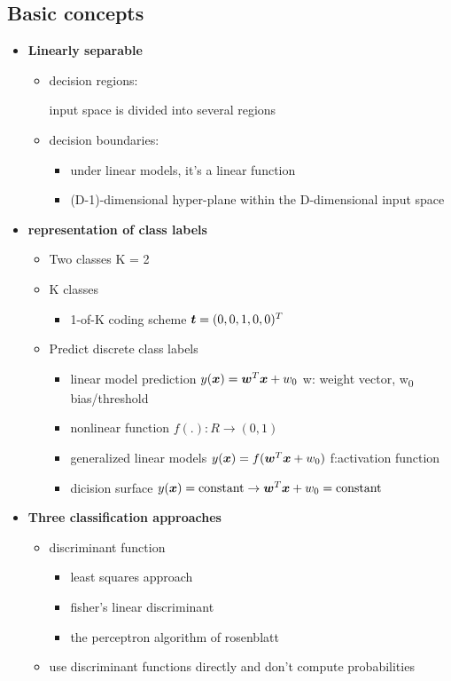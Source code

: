 \documentclass[11pt]{article}
\begin{document}
\subsection{Basic concepts}
\label{sec:org938d97f}
\begin{itemize}
\item \textbf{Linearly separable}
\begin{itemize}
\item decision regions:

input space is divided into several regions
\item decision boundaries:
\begin{itemize}
\item under linear models, it's a linear function
\item (D-1)-dimensional hyper-plane within the D-dimensional input space
\end{itemize}
\end{itemize}
\item \textbf{representation of class labels}
\begin{itemize}
\item Two classes K = 2
\item K classes
\begin{itemize}
\item 1-of-K coding scheme \(\boldsymbol{t}=(0,0,1,0,0)^T\)
\end{itemize}
\item Predict discrete class labels
\begin{itemize}
\item linear model prediction \(y(\boldsymbol{x})=\boldsymbol{w}^T\boldsymbol{x}+w_0\)
w: weight vector, w\textsubscript{0} bias/threshold
\item nonlinear function \(f(.):R\to(0,1)\)
\item generalized linear models
\(y(\boldsymbol{x})=f(\boldsymbol{w}^T\boldsymbol{x}+w_0)\)
f:activation function
\item dicision surface
\(y(\boldsymbol{x})=\text{constant}\to \boldsymbol{w}^T\boldsymbol{x}+w_0=\text{constant}\)
\end{itemize}
\end{itemize}
\item \textbf{Three classification approaches}
\begin{itemize}
\item discriminant function
\begin{itemize}
\item least squares approach
\item fisher's linear discriminant
\item the perceptron algorithm of rosenblatt
\end{itemize}
\item use discriminant functions directly and don't compute probabilities


\end{itemize}
\end{itemize}
\end{document}
